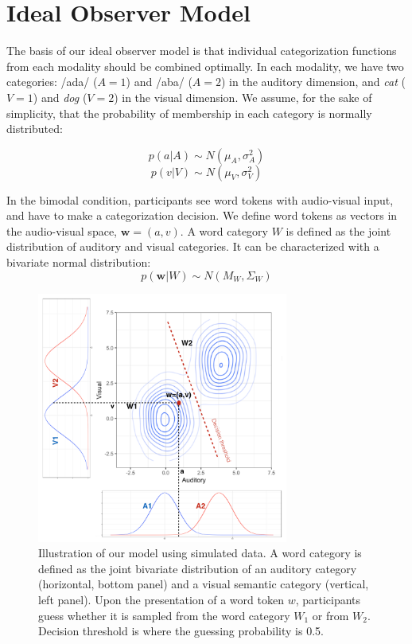 \documentclass[10pt,letterpaper]{article}
\begin{document}
\section{Ideal Observer Model}

The basis of our ideal observer model is that individual categorization functions from each modality should be combined optimally.
In each modality, we have two categories: /ada/ ($A=1$) and /aba/ ($A=2$) in the auditory dimension, and \textit{cat} ($V=1$) and \textit{dog} ($V=2$) in the visual dimension.
We assume, for the sake of simplicity, that the probability of membership in each category is normally distributed:

$$ p(a | A) \sim  N(\mu_A, \sigma^2_A) $$
$$ p(v | V) \sim  N(\mu_V, \sigma^2_V) $$

In the bimodal condition, participants see word tokens with audio-visual input, and have to make a categorization decision. We define word tokens as vectors in the audio-visual space, $\mathbf{w}=(a,v)$.
A word category $W$ is defined as the joint distribution of auditory and visual categories. It can be characterized with a bivariate normal distribution:
$$ p(\mathbf{w} | W) \sim  N(M_W, \Sigma_W) $$

\begin{figure}[tp]
  \centering
  \includegraphics[width=3.25in]{MyTask.png}
  \caption{Illustration of our model using simulated data. A word category is defined as the joint bivariate distribution of an auditory category (horizontal, bottom panel) and a visual semantic category (vertical, left panel). Upon the presentation of a word token $w$, participants guess whether it is sampled from the word category $W_1$ or from $W_2$. Decision threshold is where the guessing probability is 0.5.}
  \label{fig:space}
\end{figure}
\end{document}
